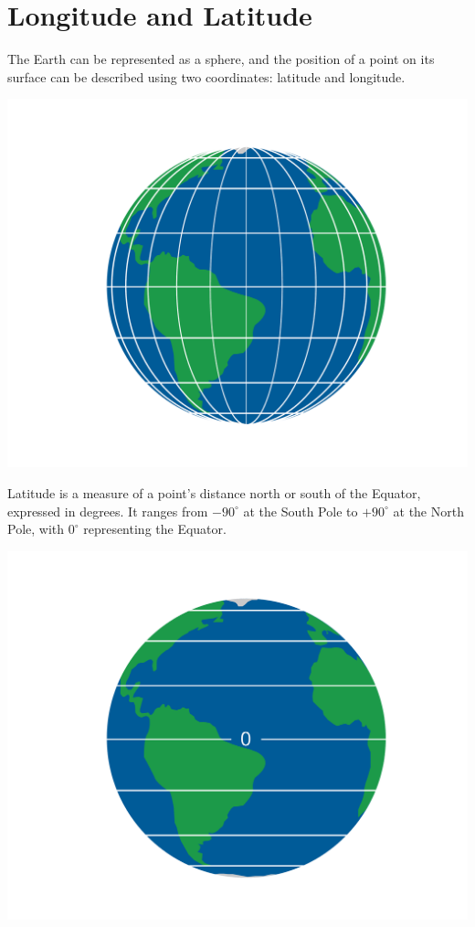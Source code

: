 \chapter{Longitude and Latitude}


The Earth can be represented as a sphere, and the position of a point
on its surface can be described using two coordinates: latitude and
longitude. 

\includegraphics[width=\textwidth]{latLon.png}


Latitude is a measure of a point's distance north or south of the
Equator, expressed in degrees. It ranges from $-90^{\circ}$ at the
South Pole to $+90^{\circ}$ at the North Pole, with $0^{\circ}$
representing the Equator.

\includegraphics[width=\textwidth]{lat.png}

